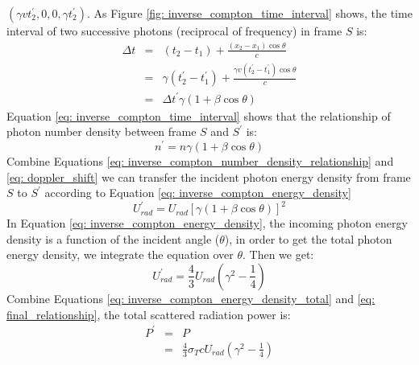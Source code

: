 \documentclass[12pt]{report}
\begin{document}
      $\left(\gamma v t_{2}^{\prime}, 0, 0, \gamma t_{2}^{\prime}\right)$. 
      As Figure \ref{fig: inverse_compton_time_interval} shows, the time interval of two 
      successive photons (reciprocal of frequency) in frame $S$ is: 
      \begin{eqnarray}
        \label{eq: inverse_compton_time_interval}
        \Delta t &=& \left(t_2 - t_1\right) + \frac{\left(x_2 - x_1\right) \cos{\theta}}{c}  \nonumber \\
                &=& \gamma \left(t_{2}^{\prime} - t_{1}^{\prime}\right) + \frac{\gamma v \left(t_{2}^{\prime} - t_{1}^{\prime}\right) \cos{\theta}}{c} \nonumber \\
                &=&  \Delta t^{\prime} \gamma \left(1 + \beta \cos{\theta}\right) 
      \end{eqnarray}
      Equation \ref{eq: inverse_compton_time_interval} shows that the relationship of photon 
      number density between frame $S$ and $S^{\prime}$ is:
      \begin{equation}
          \label{eq: inverse_compton_number_density_relationship}
          n^{\prime} = n \gamma \left(1 + \beta \cos{\theta}\right) 
      \end{equation}
      Combine Equations \ref{eq: inverse_compton_number_density_relationship} and 
      \ref{eq: doppler_shift} we can transfer the incident photon energy density from 
      frame $S$ to $S^{\prime}$ according to Equation \ref{eq: inverse_compton_energy_density}
      \begin{equation}
        \label{eq: inverse_compton_energy_density}
        U_{rad}^{\prime} = U_{rad} \left[\gamma \left(1 + \beta \cos{\theta}\right)\right]^{2}
      \end{equation}
      In Equation \ref{eq: inverse_compton_energy_density}, the incoming photon energy density 
      is a function of the incident angle ($\theta$), in order to get the total photon 
      energy density, we integrate the equation over $\theta$. Then we get: 
      \begin{equation}
        \label{eq: inverse_compton_energy_density_total}
        U_{rad}^{\prime} = \frac{4}{3} U_{rad} \left(\gamma^2 - \frac{1}{4}\right)
      \end{equation}
      Combine Equations \ref{eq: inverse_compton_energy_density_total} and 
      \ref{eq: final_relationship}, the total scattered radiation power is:
      \begin{eqnarray}
        \label{eq: inverse_compton_power}
        P^{\prime} &=& P  \nonumber \\
                  &=& \frac{4}{3} \sigma_{T} c U_{rad} \left(\gamma^2 - \frac{1}{4}\right)
      \end{eqnarray}
\end{document}
